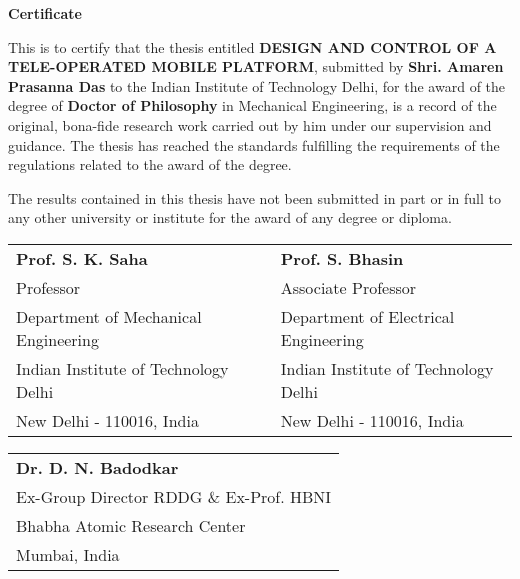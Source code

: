 \doublespacing
\thispagestyle{empty}

\begin{center}
\textbf{\Large{Certificate}}
\end{center}

This is to certify that the thesis entitled \textbf{DESIGN AND CONTROL OF A TELE-OPERATED MOBILE PLATFORM}, submitted by \textbf{Shri. Amaren   Prasanna Das} to the Indian Institute of Technology Delhi, for the award of the degree of \textbf{Doctor of Philosophy} in Mechanical Engineering, is a record of the original, bona-fide research work carried out by him under our supervision and guidance. The thesis has reached the standards fulfilling the requirements of the regulations related to the award of the degree.

The results contained in this thesis have not been submitted in part or in full to any other university or institute for the award of any degree or diploma.
\bigskip
\bigskip
\bigskip
\bigskip
\bigskip

\begin{tabular}{l l l}
\textbf{Prof. S. K. Saha} &  & \textbf{Prof. S. Bhasin}\\
Professor & &Associate Professor\\
Department of Mechanical Engineering &  & Department of Electrical Engineering\\
Indian Institute of Technology Delhi &  & Indian Institute of Technology Delhi\\
New Delhi - 110016, India & \quad \quad \quad & New Delhi - 110016, India
\end{tabular}
\bigskip
\bigskip
\bigskip
\bigskip
\bigskip

\begin{tabular}{l}
\textbf{Dr. D. N. Badodkar}\\
Ex-Group Director RDDG \& Ex-Prof. HBNI  \\  
Bhabha Atomic Research Center\\
Mumbai, India\\
\end{tabular}











\pagebreak 
\thispagestyle{empty}
\mbox{}
\restoregeometry